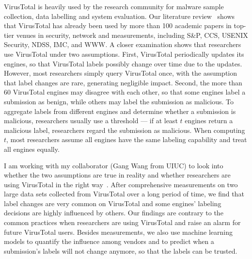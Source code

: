 \documentclass[10pt]{article}
\begin{document}
VirusTotal is heavily used by the research community for malware sample collection,
data labelling and system evaluation. 
Our literature review~\cite{vt-jianjun} shows that 
VirusTotal has already been used by more than 100 academic 
papers in top-tier venues 
in security, network and measurements, including S\&P, CCS, 
USENIX Security, NDSS, IMC, and WWW.
A closer examination shows that researchers use VirusTotal under two assumptions. 
First, VirusTotal periodically updates its engines, 
so that VirusTotal labels possibly change over time due to the updates. 
However, most researchers simply query VirusTotal once, 
with the assumption that label changes are rare, 
generating negligible impact. 
Second, the more than 60 VirusTotal engines 
may disagree with each other, 
so that some engines label a submission as benign, 
while others may label the submission as malicious. 
To aggregate labels from different engines and determine whether a submission is malicious,
researchers usually use a threshold --- 
if at least $t$ engines return a malicious label,
researchers regard the submission as malicious. 
When computing $t$, most researchers assume all engines have the 
same labeling capability and treat all engines equally. 

I am working with my collaborator (Gang Wang from UIUC) to look into 
whether the two assumptions are true in reality
and whether researchers are using VirusTotal in the right way~\cite{vt-jianjun,imc-peng}. 
After comprehensive measurements on two large data sets collected from VirusTotal
over a long period of time, 
we find that label changes are very common on VirusTotal and 
some engines' labeling decisions are highly influenced by others. 
Our findings are contrary to the common practices when researchers are using VirusTotal
and raise an alarm for future VirusTotal users. 
Besides measurements, we also use machine learning models to quantify the influence 
among vendors and to predict when a submission's labels will not change anymore, 
so that the labels can be trusted. 


\vspace{-.1in}
\end{document}
